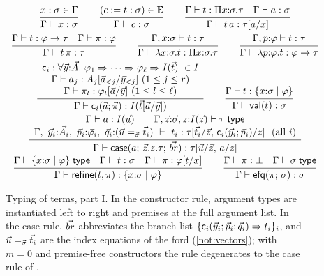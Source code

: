\begin{figure}[tp]
\small
\[
\begin{array}{c}
\rul{x : \sigma \in \Gamma}{\Gamma \vdash x : \sigma}
\qquad
\rul{(c \defeq t : \sigma) \in \Env}{\Gamma \vdash c : \sigma}
\qquad
\rul{\Gamma \vdash t : \Pi x{:}\sigma.\tau \quad \Gamma \vdash a : \sigma}
    {\Gamma \vdash t\,a : \subst{\tau}{a}{x}}
\\[2.2ex]
\rul{\Gamma \vdash t : \varphi \to \tau \quad \Gamma \vdash \pi : \varphi}
    {\Gamma \vdash t\,\pi : \tau}
\qquad
\rul{\Gamma, x{:}\sigma \vdash t : \tau}
    {\Gamma \vdash \lambda x{:}\sigma.t : \Pi x{:}\sigma.\tau}
\qquad
\rul{\Gamma, p{:}\varphi \vdash t : \tau}
    {\Gamma \vdash \lambda p{:}\varphi.t : \varphi \to \tau}
\\[2.2ex]
\rul{\begin{array}{c}
     \wcns{c}_i : \forall \tup{y}{:}\tup{A}.\ \varphi_1 \Rightarrow \dots
       \Rightarrow \varphi_\ell \Rightarrow I(\tup{t}) \ \in I \\
     \Gamma \vdash a_j : \subst{A_{j}}{\tup{a}_{<j}}{\tup{y}_{<j}}
       \ (1 \le j \le r) \\
     \Gamma \vdash \pi_l : \subst{\varphi_l}{\tup{a}}{\tup{y}}
       \ (1 \le l \le \ell)
     \end{array}}
    {\Gamma \vdash \wcns{c}_i(\tup{a}; \tup{\pi}) :
       I(\subst{\tup{t}}{\tup{a}}{\tup{y}})}
\qquad
\rul{\Gamma \vdash t : \refty{x{:}\sigma}{\varphi}}
    {\Gamma \vdash \tval{t} : \sigma}
\\[2.2ex]
\rul{\begin{array}{c}
     \Gamma \vdash a : I(\tup{u}) \qquad
     \Gamma, \tup{z}{:}\tup{\sigma}, z{:}I(\tup{z}) \vdash \tau \styp \\
     \Gamma,\ \tup{y}_i{:}\tup{A}_i,\ \tup{p}_i{:}\tup{\varphi}_i,\
       \tup{q}_i{:}(\tup{u} =_{\tup{\sigma}} \tup{t}_i)
       \ \vdash\ t_i :
       \tau[\tup{t}_i/\tup{z},\, \wcns{c}_i(\tup{y}_i;\tup{p}_i)/z]
       \ \ (\text{all } i)
     \end{array}}
    {\Gamma \vdash \tcase{a}{\tup{z}.z.\tau}{\tup{br}}
      : \tau[\tup{u}/\tup{z},\, a/z]}
\\[2.2ex]
\rul{\Gamma \vdash \refty{x{:}\sigma}{\varphi} \styp \quad
     \Gamma \vdash t : \sigma \quad
     \Gamma \vdash \pi : \subst{\varphi}{t}{x}}
    {\Gamma \vdash \trefine{t}{\pi} : \refty{x{:}\sigma}{\varphi}}
\qquad
\rul{\Gamma \vdash \pi : \bot \quad \Gamma \vdash \sigma \styp}
    {\Gamma \vdash \texfalso{\pi}{\sigma} : \sigma}
\end{array}
\]
\caption{Typing of terms, part I.  In the constructor rule, argument
  types are instantiated left to right and premises at the full
  argument list.  In the case rule, $\vec{br}$ abbreviates the branch
  list $\{\mathsf{c}_i(\vec{y}_i;\vec{p}_i;\vec{q}_i) \Rightarrow
  t_i\}_i$, and $\vec{u} =_{\vec{\sigma}} \vec{t}_i$ are the index
  equations of the ford (\cref{not:vectors}); with $m = 0$ and
  premise-free constructors the rule degenerates to the case rule of
  \cite{Extraction2026}.}
\label{fig:terms}
\end{figure}

